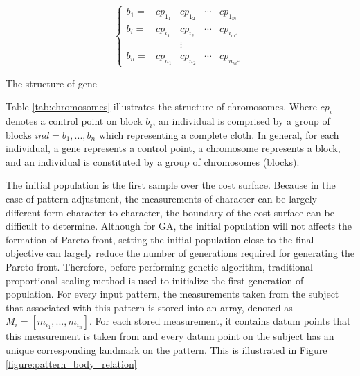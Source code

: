 \begin{table}[H]
\centering
\begin{equation}
\left\{\begin{matrix}
b_{1}= & cp_{1_{1}} & cp_{1_{2}} & \cdots & cp_{1_{m}} \\ 
b_{i}= & cp_{i_{1}} & cp_{i_{2}} & \cdots & cp_{i_{m'}}\\ 
& &\vdots \\
b_{n}= & cp_{n_{1}} & cp_{n_{2}} & \cdots & cp_{n_{m''}}\
\end{matrix}\right.
\end{equation}

\caption{The structure of gene}
        \label{tab:chromosomes} %
\end{table}

Table \ref{tab:chromosomes} illustrates the structure of chromosomes. Where $cp_{i}$ denotes a control point on block $b_{i}$, an individual is comprised by a group of blocks $ind = {b_{1}, ... , b_{n}}$ which representing a complete cloth. In general, for each individual, a gene represents a control point, a chromosome represents a block, and an individual is constituted by a group of chromosomes (blocks).

The initial population is the first sample over the cost surface. Because in the case of pattern adjustment, the measurements of character can be largely different form character to character, the boundary of the cost surface can be difficult to determine. Although for GA, the initial population will not affects the formation of Pareto-front, setting the initial population close to the final objective can largely reduce the number of generations required for generating the Pareto-front. Therefore, before performing genetic algorithm, traditional proportional scaling method is used to initialize the first generation of population. For every input pattern, the measurements taken from the subject that associated with this pattern is stored into an array, denoted as $M_{i} = [m_{i_{1}}, ... , m_{i_{n}}]$. For each stored measurement, it contains datum points that this measurement is taken from and every datum point on the subject has an unique corresponding landmark on the pattern. This is illustrated in Figure \ref{figure:pattern_body_relation} 

